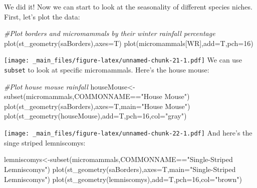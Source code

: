 \documentclass[
]{book}
\newenvironment{Shaded}{\begin{snugshade}}{\end{snugshade}}
\newcommand{\AttributeTok}[1]{\textcolor[rgb]{0.77,0.63,0.00}{#1}}
\newcommand{\CommentTok}[1]{\textcolor[rgb]{0.56,0.35,0.01}{\textit{#1}}}
\newcommand{\DecValTok}[1]{\textcolor[rgb]{0.00,0.00,0.81}{#1}}
\newcommand{\FunctionTok}[1]{\textcolor[rgb]{0.00,0.00,0.00}{#1}}
\newcommand{\NormalTok}[1]{#1}
\newcommand{\OtherTok}[1]{\textcolor[rgb]{0.56,0.35,0.01}{#1}}
\newcommand{\SpecialCharTok}[1]{\textcolor[rgb]{0.00,0.00,0.00}{#1}}
\newcommand{\StringTok}[1]{\textcolor[rgb]{0.31,0.60,0.02}{#1}}
\begin{document}
We did it! Now we can start to look at the seasonality of different species niches. First, let's plot the data:

\begin{Shaded}
\begin{Highlighting}[]
\CommentTok{\#Plot borders and micromammals by their winter rainfall percentage}
\FunctionTok{plot}\NormalTok{(}\FunctionTok{st\_geometry}\NormalTok{(saBorders),}\AttributeTok{axes=}\NormalTok{T)}
\FunctionTok{plot}\NormalTok{(micromammals[}\StringTok{\textquotesingle{}WR\textquotesingle{}}\NormalTok{],}\AttributeTok{add=}\NormalTok{T,}\AttributeTok{pch=}\DecValTok{16}\NormalTok{)}
\end{Highlighting}
\end{Shaded}

\texttt{[image: \_main\_files/figure-latex/unnamed-chunk-21-1.pdf]}
We can use \texttt{subset} to look at specific micromammals. Here's the house mouse:

\begin{Shaded}
\begin{Highlighting}[]
\CommentTok{\#Plot house mouse rainfall }
\NormalTok{houseMouse}\OtherTok{\textless{}{-}}\FunctionTok{subset}\NormalTok{(micromammals,COMMONNAME}\SpecialCharTok{==}\StringTok{"House Mouse"}\NormalTok{)}
\FunctionTok{plot}\NormalTok{(}\FunctionTok{st\_geometry}\NormalTok{(saBorders),}\AttributeTok{axes=}\NormalTok{T,}\AttributeTok{main=}\StringTok{"House Mouse"}\NormalTok{)}
\FunctionTok{plot}\NormalTok{(}\FunctionTok{st\_geometry}\NormalTok{(houseMouse),}\AttributeTok{add=}\NormalTok{T,}\AttributeTok{pch=}\DecValTok{16}\NormalTok{,}\AttributeTok{col=}\StringTok{"gray"}\NormalTok{)}
\end{Highlighting}
\end{Shaded}

\texttt{[image: \_main\_files/figure-latex/unnamed-chunk-22-1.pdf]}
And here's the singe striped lemniscomys:

\begin{Shaded}
\begin{Highlighting}[]
\NormalTok{lemniscomys}\OtherTok{\textless{}{-}}\FunctionTok{subset}\NormalTok{(micromammals,COMMONNAME}\SpecialCharTok{==}\StringTok{"Single{-}Striped Lemniscomys"}\NormalTok{)}
\FunctionTok{plot}\NormalTok{(}\FunctionTok{st\_geometry}\NormalTok{(saBorders),}\AttributeTok{axes=}\NormalTok{T,}\AttributeTok{main=}\StringTok{"Single{-}Striped Lemniscomys"}\NormalTok{)}
\FunctionTok{plot}\NormalTok{(}\FunctionTok{st\_geometry}\NormalTok{(lemniscomys),}\AttributeTok{add=}\NormalTok{T,}\AttributeTok{pch=}\DecValTok{16}\NormalTok{,}\AttributeTok{col=}\StringTok{"brown"}\NormalTok{)}
\end{Highlighting}
\end{Shaded}
\end{document}
